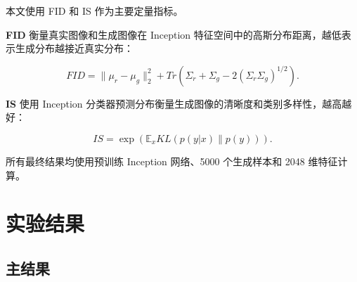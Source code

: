 \documentclass[UTF8,a4paper,12pt]{ctexart}
\begin{document}
本文使用 FID 和 IS 作为主要定量指标。


\textbf{FID} 衡量真实图像和生成图像在 Inception 特征空间中的高斯分布距离，越低表示生成分布越接近真实分布：


$$
FID = \|\mu_r - \mu_g\|_2^2 +
Tr(\Sigma_r + \Sigma_g - 2(\Sigma_r\Sigma_g)^{1/2}).
$$


\textbf{IS} 使用 Inception 分类器预测分布衡量生成图像的清晰度和类别多样性，越高越好：


$$
IS = \exp(\mathbb{E}_x KL(p(y|x) \| p(y))).
$$


所有最终结果均使用预训练 Inception 网络、5000 个生成样本和 2048 维特征计算。


\section{实验结果}

\subsection{主结果}
\end{document}
